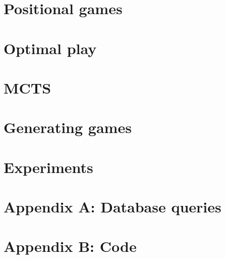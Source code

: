 \documentclass[12pt]{article}
\begin{document}
\section{Positional games}
\label{sec:positional_games}


\section{Optimal play}
\label{sec:optimal_play}


\section{MCTS}
\label{sec:mcts}


\section{Generating games}
\label{sec:generating_games}


\section{Experiments}
\label{sec:experiments}

\pagebreak
% 



\pagebreak
\section{Appendix A: Database queries}
\label{sec:database_queries}

\pagebreak
\section{Appendix B: Code}
\label{sec:code}

\end{document}
